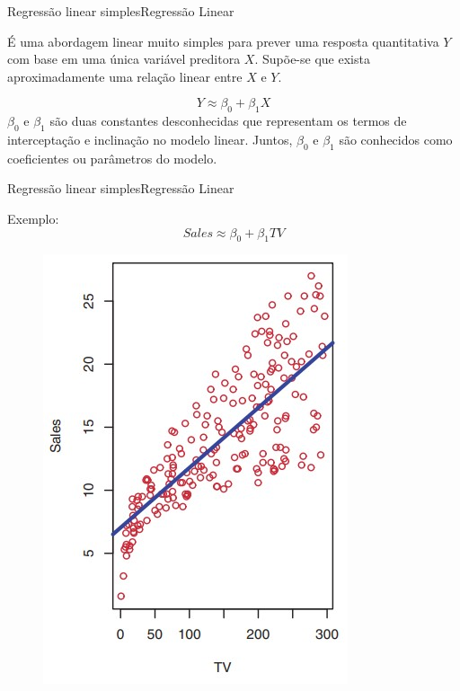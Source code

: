\documentclass[t]{beamer}
\begin{document}

\begin{ftst}{Regressão linear simples}{Regressão Linear}

É uma abordagem linear muito simples para prever uma resposta quantitativa $Y$ com base em uma única variável preditora $X$. 
\vone
Supõe-se que exista aproximadamente uma relação linear entre $X$ e $Y$.

\begin{equation}
    Y \approx \beta_0 + \beta_1 X
\end{equation}
\vone
$\beta_0$ e $\beta_1$ são duas constantes desconhecidas que representam os termos de interceptação e inclinação no modelo linear.
\vone
Juntos, $\beta_0$ e $\beta_1$ são conhecidos como coeficientes ou parâmetros do modelo. 

\end{ftst}


\begin{ftst}{Regressão linear simples}{Regressão Linear}

Exemplo: 
\large
\begin{equation}
    Sales \approx \beta_0 + \beta_1 TV
\end{equation}

\begin{figure}
    \centering
    \includegraphics[scale=0.5]{Figuras/slide05_01.jpg}
\end{figure}


\end{ftst}
\end{document}
